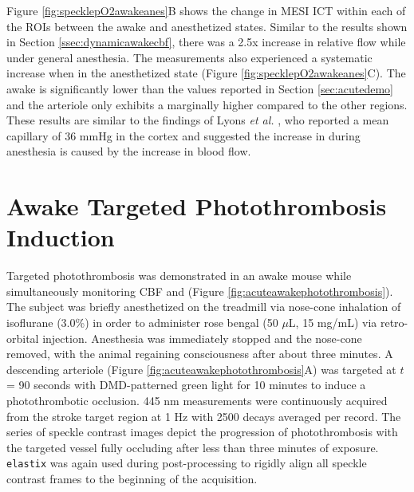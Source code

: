 Figure \ref{fig:specklepO2awakeanes}B shows the change in MESI ICT within each of the ROIs between the awake and anesthetized states. Similar to the results shown in Section \ref{ssec:dynamicawakecbf}, there was a 2.5x increase in relative flow while under general anesthesia. The  measurements also experienced a systematic increase when in the anesthetized state (Figure \ref{fig:specklepO2awakeanes}C). The awake  is significantly lower than the values reported in Section \ref{sec:acutedemo} and the arteriole only exhibits a marginally higher  compared to the other regions. These results are similar to the findings of Lyons \textit{et al.} \cite{Lyons:2016bd}, who reported a mean capillary  of 36 mmHg in the cortex and suggested the increase in  during anesthesia is caused by the increase in blood flow.



\section{Awake Targeted Photothrombosis Induction}

Targeted photothrombosis was demonstrated in an awake mouse while simultaneously monitoring CBF and  (Figure \ref{fig:acuteawakephotothrombosis}). The subject was briefly anesthetized on the treadmill via nose-cone inhalation of isoflurane (3.0\%) in order to administer rose bengal (50 $\mu$L, 15 mg/mL) via retro-orbital injection. Anesthesia was immediately stopped and the nose-cone removed, with the animal regaining consciousness after about three minutes. A descending arteriole (Figure \ref{fig:acuteawakephotothrombosis}A) was targeted at $t$ = 90 seconds with DMD-patterned green light for 10 minutes to induce a photothrombotic occlusion. 445 nm  measurements were continuously acquired from the stroke target region at 1 Hz with 2500 decays averaged per record. The series of speckle contrast images depict the progression of photothrombosis with the targeted vessel fully occluding after less than three minutes of exposure. \texttt{elastix} was again used during post-processing to rigidly align all speckle contrast frames to the beginning of the acquisition.

